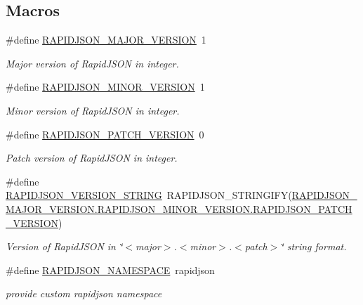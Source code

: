 \subsection*{Macros}
\begin{DoxyCompactItemize}
\item 
\#define \hyperlink{a00833_gaf1ff1685be6cbebb5d4b2ab997776f45}{R\+A\+P\+I\+D\+J\+S\+O\+N\+\_\+\+M\+A\+J\+O\+R\+\_\+\+V\+E\+R\+S\+I\+ON}~1
\begin{DoxyCompactList}\small\item\em Major version of Rapid\+J\+S\+ON in integer. \end{DoxyCompactList}\item 
\#define \hyperlink{a00833_gaf9125105c593a636a79f1c2d96835376}{R\+A\+P\+I\+D\+J\+S\+O\+N\+\_\+\+M\+I\+N\+O\+R\+\_\+\+V\+E\+R\+S\+I\+ON}~1
\begin{DoxyCompactList}\small\item\em Minor version of Rapid\+J\+S\+ON in integer. \end{DoxyCompactList}\item 
\#define \hyperlink{a00833_gaf967d31be43666ce7f53756d73bd1cdf}{R\+A\+P\+I\+D\+J\+S\+O\+N\+\_\+\+P\+A\+T\+C\+H\+\_\+\+V\+E\+R\+S\+I\+ON}~0
\begin{DoxyCompactList}\small\item\em Patch version of Rapid\+J\+S\+ON in integer. \end{DoxyCompactList}\item 
\#define \hyperlink{a00833_gad283cfde97d9a32b7d8e8107b11f70a6}{R\+A\+P\+I\+D\+J\+S\+O\+N\+\_\+\+V\+E\+R\+S\+I\+O\+N\+\_\+\+S\+T\+R\+I\+NG}~R\+A\+P\+I\+D\+J\+S\+O\+N\+\_\+\+S\+T\+R\+I\+N\+G\+I\+FY(\hyperlink{a00833_gaf967d31be43666ce7f53756d73bd1cdf}{R\+A\+P\+I\+D\+J\+S\+O\+N\+\_\+\+M\+A\+J\+O\+R\+\_\+\+V\+E\+R\+S\+I\+O\+N.\+R\+A\+P\+I\+D\+J\+S\+O\+N\+\_\+\+M\+I\+N\+O\+R\+\_\+\+V\+E\+R\+S\+I\+O\+N.\+R\+A\+P\+I\+D\+J\+S\+O\+N\+\_\+\+P\+A\+T\+C\+H\+\_\+\+V\+E\+R\+S\+I\+ON})
\begin{DoxyCompactList}\small\item\em Version of Rapid\+J\+S\+ON in \char`\"{}$<$major$>$.$<$minor$>$.$<$patch$>$\char`\"{} string format. \end{DoxyCompactList}\item 
\#define \hyperlink{a00833_ga743a79d3af927391fe3eb5c979136899}{R\+A\+P\+I\+D\+J\+S\+O\+N\+\_\+\+N\+A\+M\+E\+S\+P\+A\+CE}~rapidjson
\begin{DoxyCompactList}\small\item\em provide custom rapidjson namespace \end{DoxyCompactList}\item 

\end{DoxyCompactItemize}
